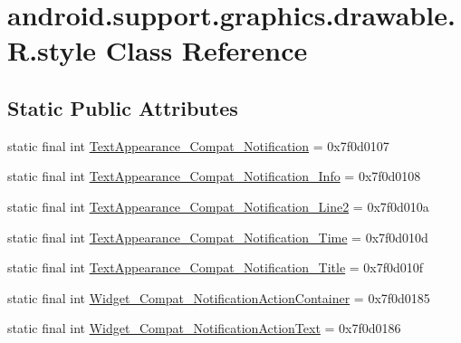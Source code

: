 \hypertarget{classandroid_1_1support_1_1graphics_1_1drawable_1_1R_1_1style}{}\section{android.\+support.\+graphics.\+drawable.\+R.\+style Class Reference}
\label{classandroid_1_1support_1_1graphics_1_1drawable_1_1R_1_1style}
\subsection*{Static Public Attributes}
\begin{DoxyCompactItemize}
\item 
static final int \mbox{\hyperlink{classandroid_1_1support_1_1graphics_1_1drawable_1_1R_1_1style_a2848fcbad5c98c38e4e64cd2935e6a14}{Text\+Appearance\+\_\+\+Compat\+\_\+\+Notification}} = 0x7f0d0107
\item 
static final int \mbox{\hyperlink{classandroid_1_1support_1_1graphics_1_1drawable_1_1R_1_1style_aa8eefa0569ad79dfe00f04b35efbc84a}{Text\+Appearance\+\_\+\+Compat\+\_\+\+Notification\+\_\+\+Info}} = 0x7f0d0108
\item 
static final int \mbox{\hyperlink{classandroid_1_1support_1_1graphics_1_1drawable_1_1R_1_1style_aa59e9e1cfdaa67f8bef74123f7d4fafd}{Text\+Appearance\+\_\+\+Compat\+\_\+\+Notification\+\_\+\+Line2}} = 0x7f0d010a
\item 
static final int \mbox{\hyperlink{classandroid_1_1support_1_1graphics_1_1drawable_1_1R_1_1style_a1c6cd73cd6d4007e927a6baf754b1969}{Text\+Appearance\+\_\+\+Compat\+\_\+\+Notification\+\_\+\+Time}} = 0x7f0d010d
\item 
static final int \mbox{\hyperlink{classandroid_1_1support_1_1graphics_1_1drawable_1_1R_1_1style_a355c96253e0416e6f38c0b82099e8f56}{Text\+Appearance\+\_\+\+Compat\+\_\+\+Notification\+\_\+\+Title}} = 0x7f0d010f
\item 
static final int \mbox{\hyperlink{classandroid_1_1support_1_1graphics_1_1drawable_1_1R_1_1style_a1d8f04477885f72e43116dd03c334cfd}{Widget\+\_\+\+Compat\+\_\+\+Notification\+Action\+Container}} = 0x7f0d0185
\item 
static final int \mbox{\hyperlink{classandroid_1_1support_1_1graphics_1_1drawable_1_1R_1_1style_a490bf3c12ac2da8140c682ca1cda94ed}{Widget\+\_\+\+Compat\+\_\+\+Notification\+Action\+Text}} = 0x7f0d0186
\end{DoxyCompactItemize}


